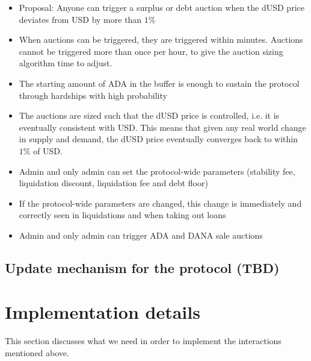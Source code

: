 \documentclass{article} %
\begin{document}
\begin{itemize}
  \item Proposal: Anyone can trigger a surplus or debt auction when the dUSD
    price deviates from USD by more than $1\%$
  \item When auctions can be triggered, they are triggered within minutes.
    Auctions cannot be triggered more than once per hour, to give the auction
    sizing algorithm time to adjust.
  \item The starting amount of ADA in the buffer is enough to sustain the
    protocol through hardships with high probability
  \item The auctions are sized such that the dUSD price is controlled, i.e. it
    is eventually consistent with USD.
    This means that given any real world change in supply and demand, the dUSD
    price eventually converges back to within $1\%$ of USD.
  \item Admin and only admin can set the protocol-wide parameters (stability
    fee, liquidation discount, liquidation fee and debt
    floor)
  \item If the protocol-wide parameters are changed, this change is immediately
    and correctly seen in liquidations and when taking out loans
  \item Admin and only admin can trigger ADA and DANA sale auctions
\end{itemize}

\subsection{Update mechanism for the protocol (TBD)}

\section{Implementation details}

This section discusses what we need in order to implement the interactions
mentioned above.
\end{document}

